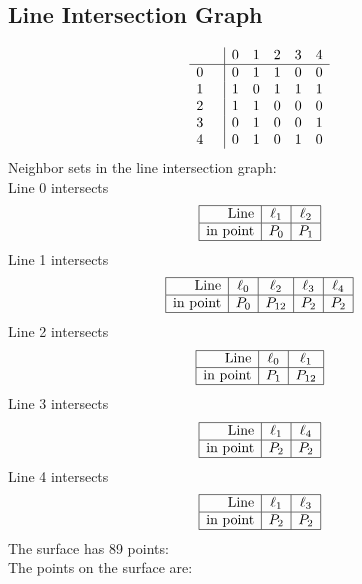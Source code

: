 \documentclass{article}
\begin{document}
{\subsection*{Line Intersection Graph}
{\arraycolsep=1pt
$$
\begin{array}{rr|*{5}r}
 &  & 0 & 1 & 2 & 3 & 4\\
\hline
0 &  & 0 & 1 & 1 & 0 & 0\\
1 &  & 1 & 0 & 1 & 1 & 1\\
2 &  & 1 & 1 & 0 & 0 & 0\\
3 &  & 0 & 1 & 0 & 0 & 1\\
4 &  & 0 & 1 & 0 & 1 & 0\\
\end{array}
$$
}%
Neighbor sets in the line intersection graph:\\
Line 0 intersects 
$$
\begin{array}{|r*{2}{|c}|}
\hline
\mbox{Line}  & \ell_{1} & \ell_{2}\\
\hline
\mbox{in point}  & P_{0} & P_{1}\\
\hline
\end{array}
$$
Line 1 intersects 
$$
\begin{array}{|r*{4}{|c}|}
\hline
\mbox{Line}  & \ell_{0} & \ell_{2} & \ell_{3} & \ell_{4}\\
\hline
\mbox{in point}  & P_{0} & P_{12} & P_{2} & P_{2}\\
\hline
\end{array}
$$
Line 2 intersects 
$$
\begin{array}{|r*{2}{|c}|}
\hline
\mbox{Line}  & \ell_{0} & \ell_{1}\\
\hline
\mbox{in point}  & P_{1} & P_{12}\\
\hline
\end{array}
$$
Line 3 intersects 
$$
\begin{array}{|r*{2}{|c}|}
\hline
\mbox{Line}  & \ell_{1} & \ell_{4}\\
\hline
\mbox{in point}  & P_{2} & P_{2}\\
\hline
\end{array}
$$
Line 4 intersects 
$$
\begin{array}{|r*{2}{|c}|}
\hline
\mbox{Line}  & \ell_{1} & \ell_{3}\\
\hline
\mbox{in point}  & P_{2} & P_{2}\\
\hline
\end{array}
$$
The surface has 89 points:\\
The points on the surface are:\\
}
\end{document}
